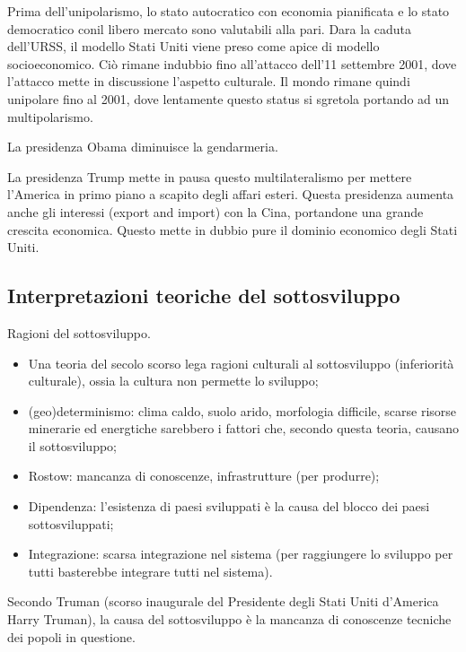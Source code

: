 \documentclass[a4paper]{article}
\begin{document}
Prima dell'unipolarismo, lo stato autocratico con economia pianificata e
lo stato democratico conil libero mercato sono valutabili alla pari.
Dara la caduta dell'URSS, il modello Stati Uniti viene preso come apice
di modello socioeconomico.
Ciò rimane indubbio fino all'attacco dell'11 settembre 2001, dove l'attacco mette
in discussione l'aspetto culturale.
Il mondo rimane quindi unipolare fino al 2001, dove lentamente questo status si sgretola
portando ad un multipolarismo.

La presidenza Obama diminuisce la gendarmeria.

La presidenza Trump mette in pausa questo multilateralismo per mettere l'America
in primo piano a scapito degli affari esteri.
Questa presidenza aumenta anche gli interessi (export and import) con la Cina, portandone
una grande crescita economica. Questo mette in dubbio pure
il dominio economico degli Stati Uniti.

\subsection{Interpretazioni teoriche del sottosviluppo}


Ragioni del sottosviluppo.

\begin{itemize}
    \item Una teoria del secolo scorso lega ragioni culturali al sottosviluppo (inferiorità culturale),
        ossia la cultura non permette lo sviluppo;
    \item (geo)determinismo: clima caldo, suolo arido, morfologia difficile,
        scarse risorse minerarie ed energtiche sarebbero i fattori che, secondo questa teoria, causano il sottosviluppo;
    \item Rostow: mancanza di conoscenze, infrastrutture (per produrre);
    \item Dipendenza: l'esistenza di paesi sviluppati è la causa del blocco dei paesi sottosviluppati;
    \item Integrazione: scarsa integrazione nel sistema (per raggiungere lo sviluppo per tutti basterebbe integrare tutti nel sistema).
\end{itemize}

Secondo Truman (scorso inaugurale del Presidente degli Stati Uniti d'America Harry Truman),
la causa del sottosviluppo è la mancanza di conoscenze tecniche dei popoli in questione.
\end{document}
